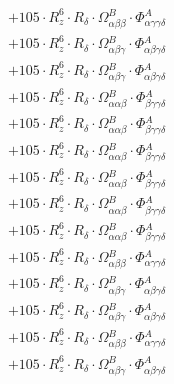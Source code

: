 \documentclass{article}
\begin{document}
\begin{subequations}
\begin{gather}
\begin{array}{c}
 \\[0.2em] 		 + 105 \cdot R_{z}^{6} \cdot R_{\delta{}} \cdot \Omega{}^{B}_{\alpha{}\beta{}\beta{}} \cdot \Phi{}^{A}_{\alpha{}\gamma{}\gamma{}\delta{}} 
 \\[0.2em] 		 + 105 \cdot R_{z}^{6} \cdot R_{\delta{}} \cdot \Omega{}^{B}_{\alpha{}\beta{}\gamma{}} \cdot \Phi{}^{A}_{\alpha{}\beta{}\gamma{}\delta{}} 
 \\[0.2em] 		 + 105 \cdot R_{z}^{6} \cdot R_{\delta{}} \cdot \Omega{}^{B}_{\alpha{}\beta{}\gamma{}} \cdot \Phi{}^{A}_{\alpha{}\beta{}\gamma{}\delta{}} 
 \\[0.2em] 		 + 105 \cdot R_{z}^{6} \cdot R_{\delta{}} \cdot \Omega{}^{B}_{\alpha{}\alpha{}\beta{}} \cdot \Phi{}^{A}_{\beta{}\gamma{}\gamma{}\delta{}} 
 \\[0.2em] 		 + 105 \cdot R_{z}^{6} \cdot R_{\delta{}} \cdot \Omega{}^{B}_{\alpha{}\alpha{}\beta{}} \cdot \Phi{}^{A}_{\beta{}\gamma{}\gamma{}\delta{}} 
 \\[0.2em] 		 + 105 \cdot R_{z}^{6} \cdot R_{\delta{}} \cdot \Omega{}^{B}_{\alpha{}\alpha{}\beta{}} \cdot \Phi{}^{A}_{\beta{}\gamma{}\gamma{}\delta{}} 
 \\[0.2em] 		 + 105 \cdot R_{z}^{6} \cdot R_{\delta{}} \cdot \Omega{}^{B}_{\alpha{}\alpha{}\beta{}} \cdot \Phi{}^{A}_{\beta{}\gamma{}\gamma{}\delta{}} 
 \\[0.2em] 		 + 105 \cdot R_{z}^{6} \cdot R_{\delta{}} \cdot \Omega{}^{B}_{\alpha{}\alpha{}\beta{}} \cdot \Phi{}^{A}_{\beta{}\gamma{}\gamma{}\delta{}} 
 \\[0.2em] 		 + 105 \cdot R_{z}^{6} \cdot R_{\delta{}} \cdot \Omega{}^{B}_{\alpha{}\alpha{}\beta{}} \cdot \Phi{}^{A}_{\beta{}\gamma{}\gamma{}\delta{}} 
 \\[0.2em] 		 + 105 \cdot R_{z}^{6} \cdot R_{\delta{}} \cdot \Omega{}^{B}_{\alpha{}\beta{}\beta{}} \cdot \Phi{}^{A}_{\alpha{}\gamma{}\gamma{}\delta{}} 
 \\[0.2em] 		 + 105 \cdot R_{z}^{6} \cdot R_{\delta{}} \cdot \Omega{}^{B}_{\alpha{}\beta{}\gamma{}} \cdot \Phi{}^{A}_{\alpha{}\beta{}\gamma{}\delta{}} 
 \\[0.2em] 		 + 105 \cdot R_{z}^{6} \cdot R_{\delta{}} \cdot \Omega{}^{B}_{\alpha{}\beta{}\gamma{}} \cdot \Phi{}^{A}_{\alpha{}\beta{}\gamma{}\delta{}} 
 \\[0.2em] 		 + 105 \cdot R_{z}^{6} \cdot R_{\delta{}} \cdot \Omega{}^{B}_{\alpha{}\beta{}\beta{}} \cdot \Phi{}^{A}_{\alpha{}\gamma{}\gamma{}\delta{}} 
 \\[0.2em] 		 + 105 \cdot R_{z}^{6} \cdot R_{\delta{}} \cdot \Omega{}^{B}_{\alpha{}\beta{}\gamma{}} \cdot \Phi{}^{A}_{\alpha{}\beta{}\gamma{}\delta{}} 

\end{array}
\end{gather}
\end{subequations}
\end{document}
